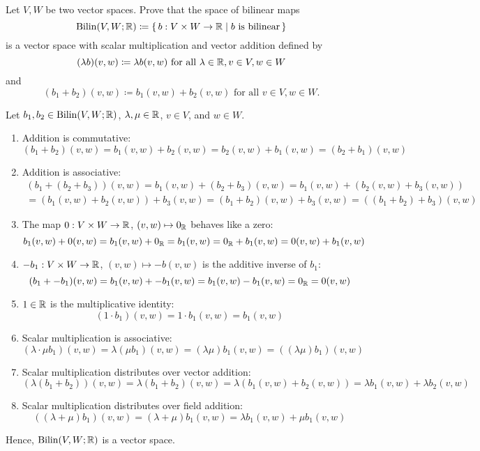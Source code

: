 \documentclass{article}
\DeclareMathOperator{\Bilin}{Bilin}
\begin{document}
\begin{problem}
Let $V, W$ be two vector spaces.
Prove that the space of bilinear maps
\[
	\Bilin(V, W; \R) \coloneq \set{b : V \times W \to \R \mid \text{$b$ is bilinear}}
\]
is a vector space with scalar multiplication and vector addition defined by
\[
	(\lambda b)(v, w) \coloneq \lambda b(v, w) \text{ for all $\lambda \in \mathbb{R}, v \in V, w \in W$}
\]
and
\[
	(b_1 + b_2)(v, w) \coloneq b_1(v, w) + b_2(v, w) \text{ for all $v \in V, w \in W$.}
\]
\end{problem}
\begin{solution}
	Let $b_1, b_2 \in \Bilin(V, W; \R)$, $\lambda, \mu \in \mathbb{R}$, $v \in V$, and $w \in W$.
	\begin{enumerate}
		\item Addition is commutative:
		      \[(b_1 + b_2)(v, w) = b_1(v, w) + b_2(v, w) = b_2(v, w) + b_1(v, w) = (b_2 + b_1)(v, w)\]
		\item Addition is associative:
		      \begin{multline*}
			      (b_1 + (b_2 + b_3))(v, w) = b_1(v, w) + (b_2 + b_3)(v, w) = b_1(v, w) + (b_2(v, w) + b_3(v, w))   \\
			      = (b_1(v, w) + b_2(v, w)) + b_3(v, w) = (b_1 + b_2)(v, w) + b_3(v, w) = ((b_1 + b_2) + b_3)(v, w)
		      \end{multline*}
		\item The map $0 : V \times W \to \mathbb{R}$, $(v, w) \mapsto 0_{\mathbb{R}}$ behaves like a zero:
		      \[
			      b_1(v, w) + 0(v, w) = b_1(v, w) + 0_{\mathbb{R}} = b_1(v, w) = 0_{\mathbb{R}} + b_1(v, w) = 0(v, w) + b_1(v, w)
		      \]
		\item $-b_1 : V \times W \to \mathbb{R}$, $(v, w) \mapsto -b(v, w)$ is the additive inverse of $b_1$:
		      \[
			      (b_1 + -b_1)(v, w) = b_1(v, w) + -b_1(v, w) = b_1(v, w) - b_1(v, w) = 0_{\mathbb{R}} = 0(v, w)
		      \]
		\item $1 \in \mathbb{R}$ is the multiplicative identity:
		      \[
			      (1 \cdot b_1)(v, w) = 1 \cdot b_1(v, w) = b_1(v, w)
		      \]
		\item Scalar multiplication is associative:
		      \[
			      (\lambda \cdot \mu b_1)(v, w) = \lambda (\mu b_1)(v, w) = (\lambda \mu) b_1(v, w) = ((\lambda \mu) b_1)(v, w)
		      \]
		\item Scalar multiplication distributes over vector addition:
		      \[
			      (\lambda (b_1 + b_2))(v, w) = \lambda (b_1 + b_2)(v, w) = \lambda (b_1(v, w) + b_2(v, w)) = \lambda b_1(v, w) + \lambda b_2(v, w)
		      \]
		\item Scalar multiplication distributes over field addition:
		      \[
			      ((\lambda + \mu)b_1)(v, w) = (\lambda + \mu)b_1(v, w) = \lambda b_1(v, w) + \mu b_1(v, w)
		      \]
	\end{enumerate}
	Hence, $\Bilin(V, W; \R)$ is a vector space.
\end{solution}
\end{document}
